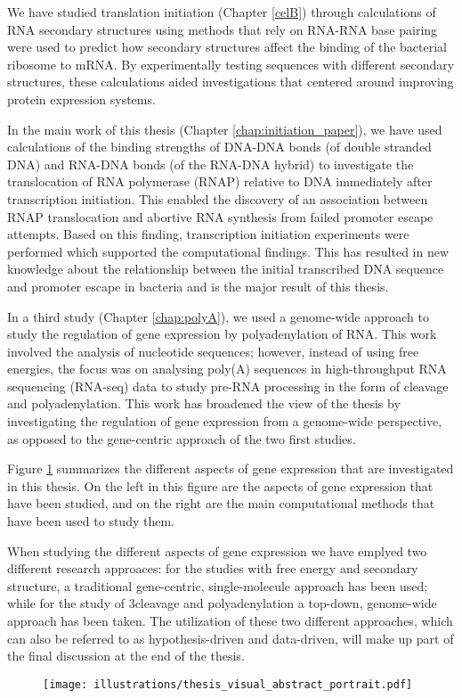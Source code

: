 We have studied translation initiation (Chapter \ref{celB}) through
calculations of RNA secondary structures using methods that rely on RNA-RNA
base pairing were used to predict how secondary structures affect the binding
of the bacterial ribosome to mRNA.  By experimentally testing sequences with
different secondary structures, these calculations aided investigations that
centered around improving protein expression systems.

In the main work of this thesis (Chapter \ref{chap:initiation_paper}), we have
used calculations of the binding strengths of DNA-DNA bonds (of double stranded
DNA) and RNA-DNA bonds (of the RNA-DNA hybrid) to investigate the translocation
of RNA polymerase (RNAP) relative to DNA immediately after transcription
initiation. This enabled the discovery of an association between RNAP
translocation and abortive RNA synthesis from failed promoter escape attempts.
Based on this finding, transcription initiation experiments were performed
which supported the computational findings. This has resulted in new knowledge
about the relationship between the initial transcribed DNA sequence and
promoter escape in bacteria and is the major result of this thesis.

In a third study (Chapter \ref{chap:polyA}), we used a genome-wide approach to
study the regulation of gene expression by polyadenylation of RNA. This work
involved the analysis of nucleotide sequences; however, instead of using free
energies, the focus was on analysing poly(A) sequences in high-throughput RNA
sequencing (RNA-seq) data to study pre-RNA processing in the form of cleavage
and polyadenylation. This work has broadened the view of the thesis by
investigating the regulation of gene expression from a genome-wide perspective,
as opposed to the gene-centric approach of the two first studies.

Figure \ref{fig:thesis_visual} summarizes the different aspects of gene
expression that are investigated in this thesis. On the left in this figure are
the aspects of gene expression that have been studied, and on the right are the
main computational methods that have been used to study them.

When studying the different aspects of gene expression we have emplyed two
different research approaces: for the studies with free energy and secondary
structure, a traditional gene-centric, single-molecule approach has been used;
while for the study of 3\ppp cleavage and polyadenylation a top-down,
genome-wide approach has been taken. The utilization of these two different
approaches, which can also be referred to as hypothesis-driven and data-driven,
will make up part of the final discussion at the end of the thesis.

\begin{figure}[htb]
	\begin{center}
		\texttt{[image: illustrations/thesis\_visual\_abstract\_portrait.pdf]}
	\end{center}
	\caption{}
	\label{fig:thesis_visual}
\end{figure}
